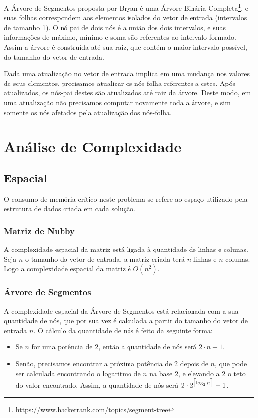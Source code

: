\documentclass{article}
\DeclarePairedDelimiter{\ceil}{\lceil}{\rceil}
\begin{document}
A Árvore de Segmentos proposta por Bryan é uma Árvore Binária Completa\footnote{\url{https://www.hackerrank.com/topics/segment-tree}}, e suas folhas correspondem aos elementos isolados do vetor de entrada (intervalos de tamanho 1). O nó pai de dois nós é a união dos dois intervalos, e suas informações de máximo, mínimo e soma são referentes ao intervalo formado. Assim a árvore é construída até sua raiz, que contém o maior intervalo possível, do tamanho do vetor de entrada.

Dada uma atualização no vetor de entrada implica em uma mudança nos valores de seus elementos, precisamos atualizar os nós folha referentes a estes. Após atualizados, os nós-pai destes são atualizados até raiz da árvore. Deste modo, em uma atualização não precisamos computar novamente toda a árvore, e sim somente os nós afetados pela atualização dos nós-folha.

\section{Análise de Complexidade}

\subsection{Espacial}

O consumo de memória crítico neste problema se refere ao espaço utilizado pela estrutura de dados criada em cada solução.

\subsubsection{Matriz de Nubby}

A complexidade espacial da matriz está ligada à quantidade de linhas e colunas. Seja $n$ o tamanho do vetor de entrada, a matriz criada terá $n$ linhas e $n$ colunas. Logo a complexidade espacial da matriz é $O(n^2)$.

\subsubsection{Árvore de Segmentos}

A complexidade espacial da Árvore de Segmentos está relacionada com a sua quantidade de nós, que por sua vez é calculada a partir do tamanho do vetor de entrada $n$. O cálculo da quantidade de nós é feito da seguinte forma:

\begin{itemize}
\item Se $n$ for uma potência de 2, então a quantidade de nós será $2 \cdot n - 1$.
\item Senão, precisamos encontrar a próxima potência de 2 depois de $n$, que pode ser calculada encontrando o logaritmo de $n$ na base 2, e elevando a 2 o teto do valor encontrado. Assim, a quantidade de nós será $2 \cdot 2^{\ceil[\big]{\log_2 n}} - 1$.
\end{itemize}
\end{document}
